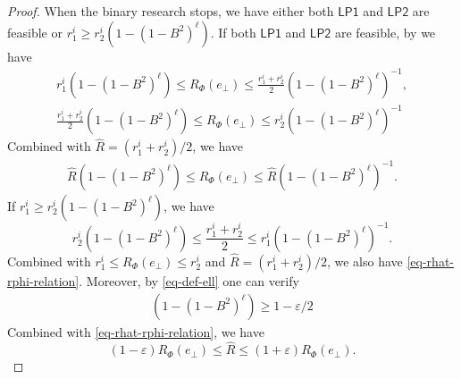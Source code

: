 \documentclass[11pt]{article}
\newcommand{\wh}[1]{\widehat{#1}}
\begin{document}
\begin{proof}
    When the binary research stops, we have either both $\mathsf{LP1}$ and $\mathsf{LP2}$ are feasible or $r^i_1 \geq r^i_2\left(1 - \left(1 - B^2\right)^{\ell}\right)$.
    If both $\mathsf{LP1}$ and $\mathsf{LP2}$ are feasible,
    by  we have
    \begin{align*}
        r^i_1 \left(1 - \left(1 - B^2\right)^{\ell}\right)\le R_{\Phi}(e_\bot) \le \frac{r^i_1+r^i_2}{2}\left(1 - \left(1 - B^2\right)^{\ell}\right)^{-1},\\
        \frac{r^i_1+r^i_2}{2} \left(1 - \left(1 - B^2\right)^{\ell}\right)\le R_{\Phi}(e_\bot) \le r^i_2\left(1 - \left(1 - B^2\right)^{\ell}\right)^{-1}
    \end{align*}
    Combined with $\wh{R} = (r^i_1+r^i_2)/2$, we have
    \begin{align}\label{eq-rhat-rphi-relation}
        \wh{R} \left(1 - \left(1 - B^2\right)^{\ell}\right)\le R_{\Phi}(e_\bot) \le \wh{R}\left(1 - \left(1 - B^2\right)^{\ell}\right)^{-1}.
    \end{align}
    If $r^i_1 \geq r^i_2\left(1 - \left(1 - B^2\right)^{\ell}\right)$, 
    we have 
    \[r^i_2\left(1 - \left(1 - B^2\right)^{\ell}\right)\leq \frac{r^i_1+r^i_2}{2} \leq r^i_1 \left(1 - \left(1 - B^2\right)^{\ell}\right)^{-1}.\]
    Combined with $r^i_1 \leq R_\Phi(e_\bot) \leq r^i_2$ and $\wh{R} = (r^i_1+r^i_2)/2$, we also have \eqref{eq-rhat-rphi-relation}.
    Moreover, by \eqref{eq-def-ell} one can verify  
    \begin{equation}
    \begin{aligned}
    \left(1 - \left(1 - B^2\right)^{\ell}\right) \geq 1 - \varepsilon/2
    \end{aligned}
    \end{equation}
    Combined with \eqref{eq-rhat-rphi-relation},
    we have 
    $$
        (1 - \varepsilon) R_{\Phi}(e_\bot) \le \wh{R} \le (1 + \varepsilon) R_{\Phi}(e_\bot).
    $$
    

\end{proof}
\end{document}
